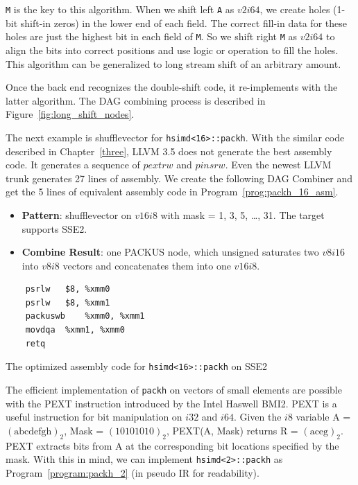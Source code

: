 {\tt M} is the key to this algorithm. When we shift left {\tt A} as $v2i64$, we create holes (1-bit shift-in zeros) in the lower end of each field. The correct fill-in data for these holes are just the highest bit in each field of {\tt M}. So we shift right {\tt M} as $v2i64$ to align the bits into correct positions and use logic or operation to fill the holes. This algorithm can be generalized to long stream shift of an arbitrary amount.

Once the back end recognizes the double-shift code, it re-implements with the latter algorithm. The DAG combining process is described in Figure~\ref{fig:long_shift_nodes}.

The next example is shufflevector for {\tt hsimd<16>::packh}. With the similar code described in Chapter~\ref{three}, LLVM 3.5 does not generate the best assembly code. It generates a sequence of $pextrw$ and $pinsrw$. Even the newest LLVM trunk generates 27 lines of assembly. We create the following DAG Combiner and get the 5 lines of equivalent assembly code in Program~\ref{prog:packh_16_asm}.
\begin{itemize}
    \item \textbf{Pattern}: shufflevector on $v16i8$ with mask = 1, 3, 5, \ldots, 31. The target supports SSE2.
    \item \textbf{Combine Result}: one PACKUS node, which unsigned saturates two $v8i16$ into $v8i8$ vectors and concatenates them into one $v16i8$.
\end{itemize}

\begin{program}[htbp!]
\begin{verbatim}
    psrlw   $8, %xmm0
    psrlw   $8, %xmm1
    packuswb    %xmm0, %xmm1
    movdqa  %xmm1, %xmm0
    retq
\end{verbatim}
\caption{The optimized assembly code for {\tt hsimd<16>::packh} on SSE2}
\label{prog:packh_16_asm}
\end{program}

\FloatBarrier
The efficient implementation of {\tt packh} on vectors of small elements are possible with the PEXT instruction introduced by the Intel Haswell BMI2. PEXT is a useful instruction for bit manipulation on $i32$ and $i64$. Given the $i8$ variable A = $(\text{abcdefgh})_2$, Mask = $(10101010)_2$, PEXT(A, Mask) returns R = $(\text{aceg})_2$. PEXT extracts bits from A at the corresponding bit locations specified by the mask. With this in mind, we can implement \verb|hsimd<2>::packh| as Program~\ref{program:packh_2} (in pseudo IR for readability).

